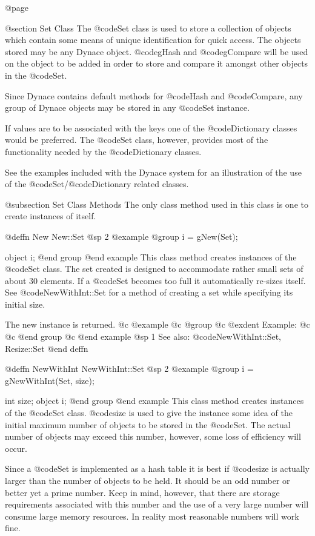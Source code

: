 @page

@section Set Class
The @code{Set} class is used to store a collection of objects which
contain some means of unique identification for quick access.  The
objects stored may be any Dynace object.  @code{gHash} and
@code{gCompare} will be used on the object to be added in order to store
and compare it amongst other objects in the @code{Set}.

Since Dynace contains default methods for @code{Hash} and @code{Compare},
any group of Dynace objects may be stored in any @code{Set} instance.

If values are to be associated with the keys one of the @code{Dictionary}
classes would be preferred.  The @code{Set} class, however, provides
most of the functionality needed by the @code{Dictionary} classes.

See the examples included with the Dynace system for an illustration of the
use of the @code{Set}/@code{Dictionary} related classes.



@subsection Set Class Methods
The only class method used in this class is one to create instances of itself.




@deffn {New} New::Set
@sp 2
@example
@group
i = gNew(Set);

object  i;
@end group
@end example
This class method creates instances of the @code{Set} class.  The set
created is designed to accommodate rather small sets of about 30
elements.  If a @code{Set} becomes too full it automatically re-sizes
itself.  See @code{NewWithInt::Set} for a method of creating a set
while specifying its initial size.

The new instance is returned.
@c @example
@c @group
@c @exdent Example:
@c 
@c @end group
@c @end example
@sp 1
See also:  @code{NewWithInt::Set, Resize::Set}
@end deffn







@deffn {NewWithInt} NewWithInt::Set
@sp 2
@example
@group
i = gNewWithInt(Set, size);

int     size;
object  i;
@end group
@end example
This class method creates instances of the @code{Set} class.
@code{size} is used to give the instance some idea of the initial maximum number
of objects to be stored in the @code{Set}.  The actual number of objects may
exceed this number, however, some loss of efficiency will occur.

Since a @code{Set} is implemented as a hash table it is best if @code{size}
is actually larger than the number of objects to be held.  It should
be an odd number or better yet a prime number.  Keep in mind, however,
that there are storage requirements associated with this number and
the use of a very large number will consume large memory resources.
In reality most reasonable numbers will work fine.

